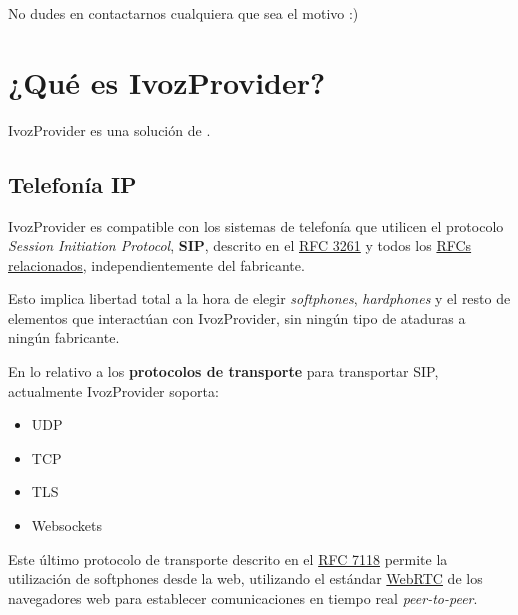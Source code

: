 \documentclass[letterpaper,10pt,spanish]{sphinxmanual}
\begin{document}
No dudes en contactarnos cualquiera que sea el motivo :)


\section{¿Qué es IvozProvider?}
\label{intro/what_is_ivozprovider::doc}\label{intro/what_is_ivozprovider:que-es-ivozprovider}
IvozProvider es una solución de {\hyperref[intro/what_is_ivozprovider:voip]{}} {\hyperref[intro/what_is_ivozprovider:multilevel]{}} {\hyperref[intro/what_is_ivozprovider:operator\string-oriented]{}} {\hyperref[intro/what_is_ivozprovider:exposed]{}}.


\subsection{Telefonía IP}
\label{intro/what_is_ivozprovider:voip}\label{intro/what_is_ivozprovider:telefonia-ip}
IvozProvider es compatible con los sistemas de telefonía que utilicen el protocolo \emph{Session Initiation Protocol}, \textbf{SIP}, descrito en el \href{https://tools.ietf.org/html/rfc3261}{RFC 3261} y todos los \href{https://www.packetizer.com/ipmc/sip/standards.html}{RFCs relacionados}, independientemente del fabricante.

Esto implica libertad total a la hora de elegir \emph{softphones}, \emph{hardphones} y el resto de elementos que interactúan con IvozProvider, sin ningún tipo de ataduras a ningún fabricante.

En lo relativo a los \textbf{protocolos de transporte} para transportar SIP, actualmente IvozProvider soporta:
\begin{itemize}
\item {} 
UDP

\item {} 
TCP

\item {} 
TLS

\item {} 
Websockets

\end{itemize}

Este último protocolo de transporte descrito en el \href{https://tools.ietf.org/html/rfc7118}{RFC 7118} permite la utilización de softphones desde la web, utilizando el estándar \href{https://webrtc.org/}{WebRTC} de los navegadores web para establecer comunicaciones en tiempo real \emph{peer-to-peer}.
\end{document}
